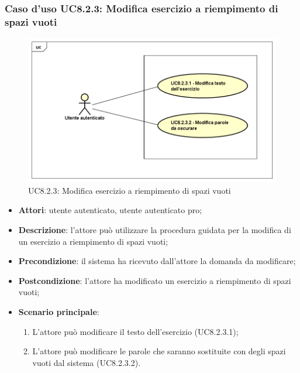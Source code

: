 \subsubsection{Caso d'uso UC8.2.3: Modifica esercizio a riempimento di spazi vuoti}
	\label{UC8.2.3}
	\begin{figure}[ht]
		\centering
			\includegraphics[scale=0.45,keepaspectratio]{UML/UC8_2_3.png}
		\caption{UC8.2.3: Modifica esercizio a riempimento di spazi vuoti}
	\end{figure}
	\FloatBarrier
	\begin{itemize}
		\item
			\textbf{Attori}: utente autenticato, utente autenticato pro;
		\item		
			\textbf{Descrizione}: l'attore può utilizzare la procedura guidata per la modifica di un esercizio a riempimento di spazi vuoti;
		\item
			\textbf{Precondizione}: il sistema ha ricevuto dall'attore la domanda da modificare;
		\item
			\textbf{Postcondizione}: l'attore ha modificato un esercizio a riempimento di spazi vuoti;
		\item
			\textbf{Scenario principale}:
	       		\begin{enumerate}
	       			\item
	       			L'attore può modificare il testo dell'esercizio (UC8.2.3.1);
	       			\item
	       			L'attore può modificare le parole che saranno sostituite con degli spazi vuoti dal sistema (UC8.2.3.2).
	 			\end{enumerate}
	\end{itemize}
	
